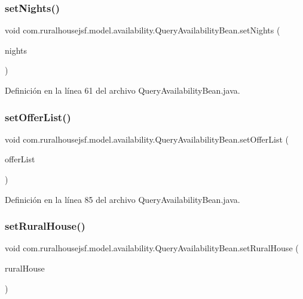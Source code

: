 \subsubsection{\texorpdfstring{setNights()}{setNights()}}
{\footnotesize\ttfamily void com.\+ruralhousejsf.\+model.\+availability.\+Query\+Availability\+Bean.\+set\+Nights (\begin{DoxyParamCaption}\item[{int}]{nights }\end{DoxyParamCaption})}



Definición en la línea 61 del archivo Query\+Availability\+Bean.\+java.

\mbox{\label{a00224_a0a1948b5e5b3b7c6028a61d194429b0d}} 
\subsubsection{\texorpdfstring{setOfferList()}{setOfferList()}}
{\footnotesize\ttfamily void com.\+ruralhousejsf.\+model.\+availability.\+Query\+Availability\+Bean.\+set\+Offer\+List (\begin{DoxyParamCaption}\item[{List$<$ \mbox{\hyperlink{a00184}{Offer}} $>$}]{offer\+List }\end{DoxyParamCaption})}



Definición en la línea 85 del archivo Query\+Availability\+Bean.\+java.

\mbox{\label{a00224_a0dfead1981002b06882aeeaac61b3102}} 
\subsubsection{\texorpdfstring{setRuralHouse()}{setRuralHouse()}}
{\footnotesize\ttfamily void com.\+ruralhousejsf.\+model.\+availability.\+Query\+Availability\+Bean.\+set\+Rural\+House (\begin{DoxyParamCaption}\item[{\mbox{\hyperlink{a00188}{Rural\+House}}}]{rural\+House }\end{DoxyParamCaption})}




